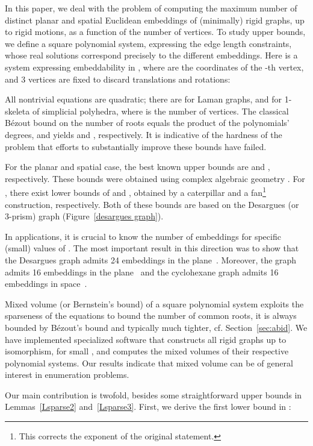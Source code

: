 \documentclass[envcountsame]{llncs}
\begin{document}
In this paper, we deal with the problem of computing the maximum number
of distinct planar and spatial Euclidean embeddings of (minimally) rigid graphs,
up to rigid motions, as a function of the number of vertices.
To study upper bounds, we define a square polynomial system, 
expressing the edge length constraints, whose real solutions correspond
precisely to the different embeddings. 
Here is a system expressing embeddability in , where  are the coordinates
of the -th vertex, and 3 vertices are fixed to discard translations and rotations:

All nontrivial equations are quadratic; there are  for Laman graphs, and 
for 1-skeleta of simplicial polyhedra, where  is the number of vertices.
The classical B\'ezout bound on the number of roots equals the product of the
polynomials' degrees, and yields  and , respectively.
It is indicative of the hardness of the problem that efforts to substantially
improve these bounds have failed.

For the planar and spatial case, the best known upper bounds are 
 and
, respectively.
These bounds were obtained using 
complex algebraic geometry \cite{B02,BS04}.
For , there exist   lower bounds of  
 and , obtained  by  a caterpillar and a 
fan\footnote{This corrects the exponent of the original statement.} construction, respectively. 
Both of these bounds  are based on the  Desargues (or 3-prism) graph
(Figure~\ref{desargues graph}).

In applications, it is crucial to know the number of embeddings for specific 
(small) values of .
The most important result in this direction was to show that the Desargues graph  admits 24
embeddings in the plane~\cite{BS04}. Moreover, the  graph admits 16 embeddings in the plane~\cite{W77,WH07}  and 
the cyclohexane graph  admits 16 embeddings in space~\cite{EM99}.



Mixed volume (or Bernstein's bound) of a square polynomial system 
exploits the sparseness of the equations to bound the number of common roots,
it is always bounded by B\'ezout's bound and typically much tighter, cf. Section~\ref{sec:abid}.
We have implemented specialized software that  constructs  all rigid graphs up to isomorphism,
for small , and computes  the mixed volumes of their respective polynomial systems.
Our results indicate that mixed volume can be of general interest in enumeration problems.

Our main contribution is twofold, besides some straightforward
upper bounds in Lemmas~\ref{Lsparse2} and~\ref{Lsparse3}. First, we derive the first lower bound in :
\end{document}
